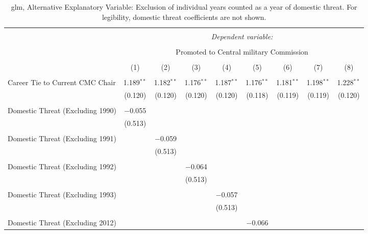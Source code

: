 \documentclass[12pt,letterpaper]{article}
\begin{document}
\begin{table}[!htbp] \centering 
	\caption{glm, Alternative Explanatory Variable: Exclusion of individual years counted as a year of domestic threat. For legibility, domestic threat coefficients are not shown.} 
	\label{table_a16}
	\rmfamily
	\scriptsize
	\begin{tabular}{@{\extracolsep{5pt}}lcccccccc} 
		\\[-1.8ex]\hline 
		\hline \\[-1.8ex] 
		& \multicolumn{8}{c}{\textit{Dependent variable:}} \\ 
		\cline{2-9} 
		\\[-1.8ex] & \multicolumn{8}{c}{Promoted to Central military Commission} \\ 
		\\[-1.8ex] & (1) & (2) & (3) & (4) & (5) & (6) & (7) & (8)\\ 
		\hline \\[-1.8ex] 
		Career Tie to Current CMC Chair & 1.189$^{**}$ & 1.182$^{**}$ & 1.176$^{**}$ & 1.187$^{**}$ & 1.176$^{**}$ & 1.181$^{**}$ & 1.198$^{**}$ & 1.228$^{**}$ \\ 
		& (0.120) & (0.120) & (0.120) & (0.120) & (0.118) & (0.119) & (0.119) & (0.120) \\ 
		& & & & & & & & \\ 
		Domestic Threat (Excluding 1990) & $-$0.055 &  &  &  &  &  &  &  \\ 
		& (0.513) &  &  &  &  &  &  &  \\ 
		& & & & & & & & \\ 
		Domestic Threat (Excluding 1991) &  & $-$0.059 &  &  &  &  &  &  \\ 
		&  & (0.513) &  &  &  &  &  &  \\ 
		& & & & & & & & \\ 
		Domestic Threat (Excluding 1992) &  &  & $-$0.064 &  &  &  &  &  \\ 
		&  &  & (0.513) &  &  &  &  &  \\ 
		& & & & & & & & \\ 
		Domestic Threat (Excluding 1993) &  &  &  & $-$0.057 &  &  &  &  \\ 
		&  &  &  & (0.513) &  &  &  &  \\ 
		& & & & & & & & \\ 
		Domestic Threat (Excluding 2012) &  &  &  &  & $-$0.066 &  &  &  \\ 

\end{tabular}
\end{table}
\end{document}
